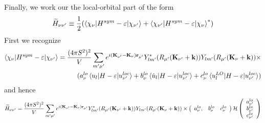 \documentclass[aps,prb,floatfix,epsfig,singlecolumn,showpacs,preprintnumbers]{revtex4}
\renewcommand{\vr}{{\mathbf{r}}}
\newcommand{\vk}{{\mathbf{k}}}
\newcommand{\vK}{{\mathbf{K}}}
\newcommand{\cH}{{\cal H}}
\begin{document}
Finally, we work our the local-orbital part of the form
\begin{eqnarray}
\widetilde{H}_{\nu\nu'}\equiv \frac{1}{2}(\braket{\chi_{\nu}|H^{sym}-\varepsilon|\chi_{\nu'}}+\braket{\chi_{\nu'}|H^{sym}-\varepsilon|\chi_{\nu}}^*)
\end{eqnarray}
First we recognize
\begin{eqnarray}
\braket{\chi_{\nu}|H^{sym}-\varepsilon|\chi_{\nu'}}=\frac{(4\pi  S^2)^2}{V}\sum_{m'\mu'} e^{i(\vK_{\nu'}-\vK_\nu)\vr_{\mu'}}Y^*_{lm'}(R_{\mu'}(\vK_{\nu'}+\vk)) Y_{lm'}(R_{\mu'}(\vK_\nu+\vk))\times\\
(a^{lo}_{\nu} \braket{u_l|H-\varepsilon|u_{\nu'}^{loc}} + 
b^{lo}_{\nu}  \braket{\dot{u}_l|H-\varepsilon|u_{\nu'}^{loc}}  + 
c^{lo}_{\nu} \braket{u^{LO}_l|H-\varepsilon|u_{\nu'}^{loc}})
\end{eqnarray}
and hence
% 
% 
%
\begin{eqnarray}
\widetilde{H}_{\nu\nu'}=\frac{(4\pi  S^2)^2}{V}\sum_{m'\mu'} e^{i(\vK_{\nu'}-\vK_\nu)\vr_{\mu'}}Y^*_{lm'}(R_{\mu'}(\vK_{\nu'}+\vk)) Y_{lm'}(R_{\mu'}(\vK_\nu+\vk))\times
\left(
\begin{array}{ccc}
a^{lo}_{\nu}, & b^{lo}_{\nu} & c^{lo}_{\nu}
\end{array}
\right)
\cH
\left(
\begin{array}{c}
a^{lo}_{\nu'}\\
b^{lo}_{\nu'}\\ 
c^{lo}_{\nu'}
\end{array}
\right)
\end{eqnarray}
\end{document}
